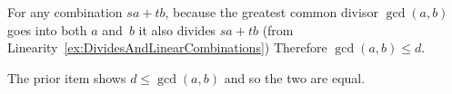 \documentclass{ibl}  %
\begin{document}
\begin{bezoutproof}
\begin{ex}
\begin{ans}
\begin{exes}
  For any combination $sa+tb$, because the greatest common divisor
  $\gcd(a,b)$ goes into both $a$ and~$b$ it also divides $sa+tb$  
  (from Linearity~\ref{ex:DividesAndLinearCombinations})
  Therefore $\gcd(a,b)\leq d$.

  The prior item shows $d\leq\gcd(a,b)$ and so the two are equal. 





\end{exes}
\end{ans}
\end{ex}


\end{bezoutproof}
\end{document}
